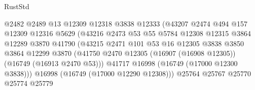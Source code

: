 \begin{lexlean}{RustStd}
\begin{coremodule}
                                        @2482
                                        @2489
                                        @13
                                        @12309
                                        @12318
                                        @3838
                                        @12333
                                        (@43207
                                          @2474
                                          @494
                                          @157
                                          @12309
                                          @12316
                                          @5629
                                          (@43216
                                            @2473
                                            @53
                                            @55
                                            @5784
                                            @12308
                                            @12315
                                            @3864
                                            @12289
                                            @3870
                                            @41790
                                            (@43215
                                              @2471
                                              @101
                                              @53
                                              @16
                                              @12305
                                              @3838
                                              @3850
                                              @3864
                                              @12299
                                              @3870
                                              (@41750
                                                @2470
                                                @12305
                                                (@16907 (@16908 @12305))
                                                (@16749 (@16913 @2470 @53)))
                                              @41717
                                              @16998
                                              (@16749 (@17000 @12300 @3838)))
                                            @16998
                                            (@16749 (@17000 @12290 @12308)))
                                          @25764
                                          @25767
                                          @25770
                                          @25774
                                          @25779

\end{coremodule}
\end{lexlean}
